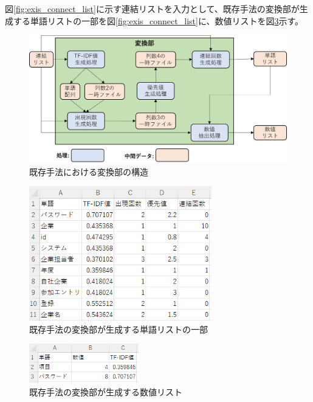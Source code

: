 図\ref{fig:exis_connect_list}に示す連結リストを入力として、既存手法の変換部が生成する単語リストの一部を図\ref{fig:exis_connect_list}に、数値リストを図\ref{fig:exis_suti_list}示す。

\begin{figure}[tp]
    \begin{center}
        \includegraphics[width=1.0\columnwidth]{image/exis_transfer_structure.png}
        \caption{既存手法における変換部の構造}
        \label{fig:exis_transfer_structure}
    \end{center}
\end{figure}

\begin{figure}[tp]
    \begin{center}
        \includegraphics[width=300]{image/exis_word_list.png}
        \caption{既存手法の変換部が生成する単語リストの一部}
        \label{fig:exis_word_list}
    \end{center}
\end{figure}

\begin{figure}[tp]
    \begin{center}
        \includegraphics[width=180]{image/exis_suti_list.png}
        \caption{既存手法の変換部が生成する数値リスト}
        \label{fig:exis_suti_list}
    \end{center}
\end{figure}

